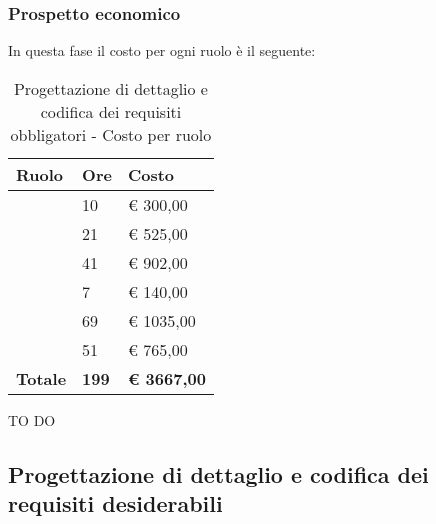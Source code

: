 		\subsubsection{Prospetto economico} %
		\label{ssub:prospetto_economico}
		In questa fase il costo per ogni ruolo è il seguente: \\
			\begin{table}[!h]
				\begin{center}
					\begin{tabularx}{0.65\textwidth}{|l|l|X|}
						\hline
						\textbf{Ruolo} & \textbf{Ore} & \textbf{Costo} \\
						\hline
						\roleProjectManager & 10 & \euro{} 300,00 \\
						\hline
						\roleAnalyst & 21 & \euro{} 525,00 \\
						\hline
						\roleDesigner & 41 & \euro{} 902,00 \\
						\hline
						\roleAdministrator & 7 & \euro{} 140,00 \\
						\hline
						\roleProgrammer & 69 & \euro{} 1035,00 \\
						\hline
						\roleVerifier & 51 & \euro{} 765,00 \\
						\hline
						\textbf{Totale} & \textbf{199} & \textbf{\euro{} 3667,00} \\
						\hline
					\end{tabularx}
				\end{center}
			\caption{Progettazione di dettaglio e codifica dei requisiti obbligatori - Costo per ruolo}
			\end{table}
		
		\noindent
		TO DO
		
	
	\subsection{Progettazione di dettaglio e codifica dei requisiti desiderabili} %
	\label{sub:progettazione_di_dettaglio_e_codifica_dei_requisiti_desiderabili}
